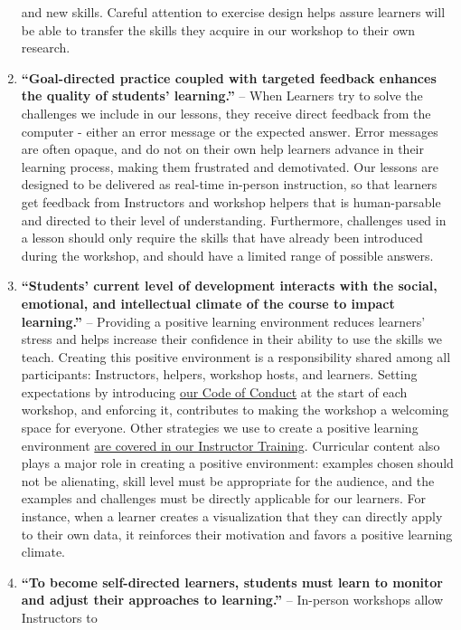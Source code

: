 \documentclass[
]{book}
\begin{document}
\begin{enumerate}
  and new skills. Careful attention to exercise design helps assure learners will
  be able to transfer the
  skills they acquire in our workshop to their own research.
\item
  \textbf{``Goal-directed practice coupled with targeted feedback enhances the quality
  of students' learning.''} -- When Learners try to solve the challenges we include in our
  lessons, they receive direct feedback from the computer - either an
  error message or the expected answer. Error messages are often opaque, and
  do not on their own help learners advance in their learning process, making them
  frustrated and demotivated. Our lessons are designed to be delivered as real-time
  in-person instruction, so that learners get feedback from Instructors and workshop helpers
  that is human-parsable and directed to their level of understanding. Furthermore,
  challenges used in a lesson should only require the skills
  that have already been introduced during the workshop, and should have a limited
  range of possible answers.
\item
  \textbf{``Students' current level of development interacts with the social,
  emotional, and intellectual climate of the course to impact learning.''} -- Providing
  a positive learning environment reduces learners' stress
  and helps increase their confidence in their ability to use the skills we teach.
  Creating this positive environment is a responsibility shared among all
  participants: Instructors, helpers, workshop hosts, and learners.
  Setting expectations by introducing
  \href{https://docs.carpentries.org/topic_folders/policies/code-of-conduct.html}{our Code of Conduct}
  at the start of each workshop, and enforcing it,
  contributes to making the workshop a welcoming space for everyone.
  Other strategies we use to create a positive learning environment \href{https://carpentries.github.io/instructor-training/08-motivation/index.html}{are covered in our
  Instructor Training}.
  Curricular content also plays a major role in creating a positive environment:
  examples chosen should not be alienating, skill level must be appropriate for
  the audience, and the examples and challenges must be directly applicable
  for our learners. For instance, when a learner
  creates a visualization that they can directly apply to their own
  data, it reinforces their motivation and favors a positive learning
  climate.
\item
  \textbf{``To become self-directed learners, students must learn to monitor and adjust
  their approaches to learning.''} -- In-person workshops allow Instructors to

\end{enumerate}
\end{document}
